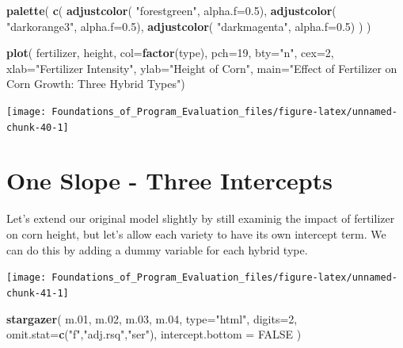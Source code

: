 \documentclass[]{book}
\newenvironment{Shaded}{\begin{snugshade}}{\end{snugshade}}
\newcommand{\DataTypeTok}[1]{\textcolor[rgb]{0.13,0.29,0.53}{#1}}
\newcommand{\DecValTok}[1]{\textcolor[rgb]{0.00,0.00,0.81}{#1}}
\newcommand{\FloatTok}[1]{\textcolor[rgb]{0.00,0.00,0.81}{#1}}
\newcommand{\KeywordTok}[1]{\textcolor[rgb]{0.13,0.29,0.53}{\textbf{#1}}}
\newcommand{\NormalTok}[1]{#1}
\newcommand{\OtherTok}[1]{\textcolor[rgb]{0.56,0.35,0.01}{#1}}
\newcommand{\StringTok}[1]{\textcolor[rgb]{0.31,0.60,0.02}{#1}}
\theoremstyle{definition}
\theoremstyle{definition}
\theoremstyle{definition}
\theoremstyle{remark}
\begin{document}
\begin{Shaded}
\begin{Highlighting}[]


\KeywordTok{palette}\NormalTok{( }\KeywordTok{c}\NormalTok{( }\KeywordTok{adjustcolor}\NormalTok{( }\StringTok{"forestgreen"}\NormalTok{, }\DataTypeTok{alpha.f=}\FloatTok{0.5}\NormalTok{), }
            \KeywordTok{adjustcolor}\NormalTok{( }\StringTok{"darkorange3"}\NormalTok{, }\DataTypeTok{alpha.f=}\FloatTok{0.5}\NormalTok{),}
            \KeywordTok{adjustcolor}\NormalTok{( }\StringTok{"darkmagenta"}\NormalTok{, }\DataTypeTok{alpha.f=}\FloatTok{0.5}\NormalTok{) ) )}
            
\KeywordTok{plot}\NormalTok{( fertilizer, height, }\DataTypeTok{col=}\KeywordTok{factor}\NormalTok{(type), }\DataTypeTok{pch=}\DecValTok{19}\NormalTok{, }\DataTypeTok{bty=}\StringTok{"n"}\NormalTok{, }\DataTypeTok{cex=}\DecValTok{2}\NormalTok{,}
      \DataTypeTok{xlab=}\StringTok{"Fertilizer Intensity"}\NormalTok{, }\DataTypeTok{ylab=}\StringTok{"Height of Corn"}\NormalTok{, }
      \DataTypeTok{main=}\StringTok{"Effect of Fertilizer on Corn Growth: Three Hybrid Types"}\NormalTok{)}
\end{Highlighting}
\end{Shaded}

\begin{center}\texttt{[image: Foundations\_of\_Program\_Evaluation\_files/figure-latex/unnamed-chunk-40-1]} \end{center}

\hypertarget{one-slope---three-intercepts}{%
\section{One Slope - Three
Intercepts}\label{one-slope---three-intercepts}}

Let's extend our original model slightly by still examinig the impact of
fertilizer on corn height, but let's allow each variety to have its own
intercept term. We can do this by adding a dummy variable for each
hybrid type.

\begin{center}\texttt{[image: Foundations\_of\_Program\_Evaluation\_files/figure-latex/unnamed-chunk-41-1]} \end{center}

\begin{Shaded}
\begin{Highlighting}[]


\KeywordTok{stargazer}\NormalTok{( m}\FloatTok{.01}\NormalTok{, m}\FloatTok{.02}\NormalTok{, m}\FloatTok{.03}\NormalTok{, m}\FloatTok{.04}\NormalTok{, }\DataTypeTok{type=}\StringTok{"html"}\NormalTok{, }
           \DataTypeTok{digits=}\DecValTok{2}\NormalTok{, }
          \DataTypeTok{omit.stat=}\KeywordTok{c}\NormalTok{(}\StringTok{"f"}\NormalTok{,}\StringTok{"adj.rsq"}\NormalTok{,}\StringTok{"ser"}\NormalTok{),}
           \DataTypeTok{intercept.bottom =} \OtherTok{FALSE}\NormalTok{ ) }
\end{Highlighting}
\end{Shaded}
\end{document}
